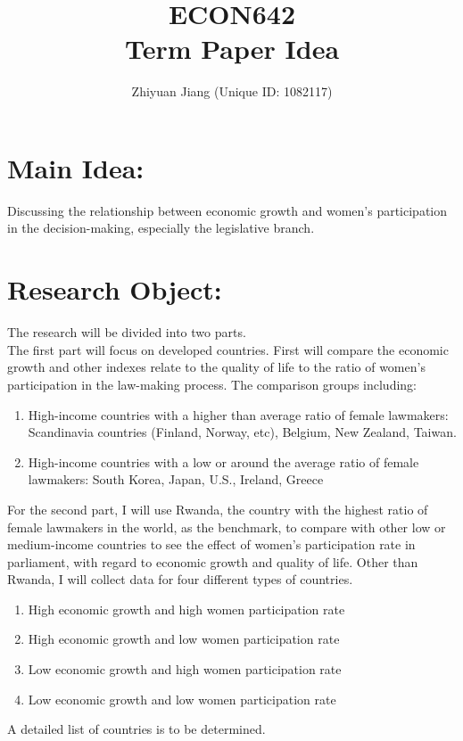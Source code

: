 \documentclass[12pt]{article}
\title{ECON642\\ Term Paper Idea \numberofweek  \titleofweek}
\author{Zhiyuan Jiang (Unique ID: 1082117)}
\begin{document}
\maketitle

\section*{Main Idea:}
Discussing the relationship between economic growth and women's participation in the decision-making, especially the legislative branch. 

\section*{Research Object:}
The research will be divided into two parts.\\

The first part will focus on developed countries.
First will compare the economic growth and other indexes relate to the quality of life to the ratio of women's participation in the law-making process.
The comparison groups including:
\begin{enumerate}
	\item High-income countries with a higher than average ratio of female lawmakers: Scandinavia countries (Finland, Norway, etc), Belgium, New Zealand, Taiwan.
	\item High-income countries with a low or around the average ratio of female lawmakers: South Korea, Japan, U.S., Ireland, Greece
\end{enumerate}

For the second part, I will use Rwanda, the country with the highest ratio of female lawmakers in the world, as the benchmark, to compare with other low or medium-income countries to see the effect of women's participation rate in parliament, with regard to economic growth and quality of life. 
Other than Rwanda, I will collect data for four different types of countries.


\begin{enumerate}
	\item High economic growth and high women participation rate
	\item High economic growth and low women participation rate
	\item Low economic growth and high women participation rate
	\item Low economic growth and low women participation rate
\end{enumerate}
A detailed list of countries is to be determined.
\end{document}

